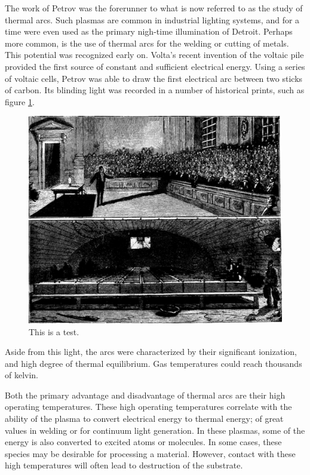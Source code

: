 The work of Petrov was the forerunner to what is now referred to as the study of
thermal arcs. Such plasmas are common in industrial lighting systems, and for a
time were even used as the primary nigh-time illumination of Detroit. Perhaps
more common, is the use of thermal arcs for the welding or cutting of metals.
This potential was recognized early on. Volta's recent invention of the voltaic
pile provided the first source of constant and sufficient electrical energy.
Using a series of voltaic cells, Petrov was able to draw the first electrical
arc between two sticks of carbon. Its blinding light was recorded in a number of
historical prints, such as figure \ref{fig:humphry}.
\begin{figure}\label{fig:humphry}
  \centering
  \includegraphics[scale=0.25]{chapters/introduction/figures/humphry.jpg}
  \caption{This is a test.}
\end{figure}
Aside from this light, the arcs were characterized by their significant
ionization, and high degree of thermal equilibrium. Gas temperatures could reach
thousands of kelvin.

Both the primary advantage and disadvantage of thermal arcs are their high
operating temperatures. These high operating temperatures correlate with the
ability of the plasma to convert electrical energy to thermal energy; of great
values in welding or for continuum light generation. In these plasmas, some of
the energy is also converted to excited atoms or molecules. In some cases, these
species may be desirable for processing a material. However, contact with these
high temperatures will often lead to destruction of the substrate.


